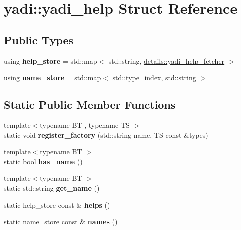\hypertarget{structyadi_1_1yadi__help}{}\section{yadi\+:\+:yadi\+\_\+help Struct Reference}
\label{structyadi_1_1yadi__help}
\subsection*{Public Types}
\begin{DoxyCompactItemize}
\item 
\mbox{\label{structyadi_1_1yadi__help_a3f208166dac982fc5ea2da59cccfd51e}} 
using {\bfseries help\+\_\+store} = std\+::map$<$ std\+::string, \hyperlink{structyadi_1_1details_1_1yadi__help__fetcher}{details\+::yadi\+\_\+help\+\_\+fetcher} $>$
\item 
\mbox{\label{structyadi_1_1yadi__help_aaa85b3a9116a8dd35a91db333576bf59}} 
using {\bfseries name\+\_\+store} = std\+::map$<$ std\+::type\+\_\+index, std\+::string $>$
\end{DoxyCompactItemize}
\subsection*{Static Public Member Functions}
\begin{DoxyCompactItemize}
\item 
\mbox{\label{structyadi_1_1yadi__help_add1c3496248cd02834c8bd835d4ac417}} 
{\footnotesize template$<$typename BT , typename TS $>$ }\\static void {\bfseries register\+\_\+factory} (std\+::string name, TS const \&types)
\item 
\mbox{\label{structyadi_1_1yadi__help_ade91b0fb56b72ee34c7e3be193faac02}} 
{\footnotesize template$<$typename BT $>$ }\\static bool {\bfseries has\+\_\+name} ()
\item 
\mbox{\label{structyadi_1_1yadi__help_a106e37c78f02730ba7d54f9892932ede}} 
{\footnotesize template$<$typename BT $>$ }\\static std\+::string {\bfseries get\+\_\+name} ()
\item 
\mbox{\label{structyadi_1_1yadi__help_a9ddef20988be744f132c45009a4c3810}} 
static help\+\_\+store const  \& {\bfseries helps} ()
\item 
\mbox{\label{structyadi_1_1yadi__help_a41fb4a566cae38f7530d1c9f08f72a8f}} 
static name\+\_\+store const  \& {\bfseries names} ()
\end{DoxyCompactItemize}


